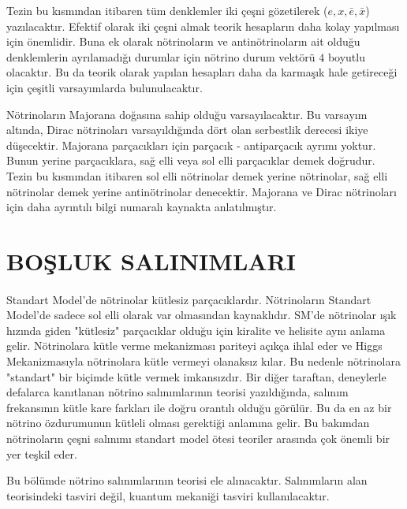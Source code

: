 Tezin bu kısmından itibaren tüm denklemler iki çeşni gözetilerek ($ e,x,\bar{e},\bar{x} $) yazılacaktır. Efektif olarak iki çeşni almak teorik hesapların daha kolay yapılması için önemlidir. Buna ek olarak nötrinoların ve antinötrinoların ait olduğu denklemlerin ayrılamadığı durumlar için nötrino durum vektörü $ 4 $ boyutlu olacaktır. Bu da teorik olarak yapılan hesapları daha da karmaşık hale getireceği için çeşitli varsayımlarda bulunulacaktır.

Nötrinoların Majorana doğasına sahip olduğu varsayılacaktır. Bu varsayım altında, Dirac nötrinoları varsayıldığında dört olan serbestlik derecesi ikiye düşecektir. Majorana parçacıkları için parçacık - antiparçacık ayrımı yoktur. Bunun yerine parçacıklara, sağ elli veya sol elli parçacıklar demek doğrudur. Tezin bu kısmından itibaren sol elli nötrinolar demek yerine nötrinolar, sağ elli nötrinolar demek yerine antinötrinolar denecektir. Majorana ve Dirac nötrinoları için daha ayrıntılı bilgi \cite{Bilenky:2020vjk} numaralı kaynakta anlatılmıştır.

\section{BOŞLUK SALINIMLARI}\label{sec:boslukSalinimlari}
\paragraph{}
Standart Model'de nötrinolar kütlesiz parçacıklardır. Nötrinoların Standart Model'de sadece sol elli olarak var olmasından kaynaklıdır. SM'de nötrinolar ışık hızında giden "kütlesiz" parçacıklar olduğu için kiralite ve helisite aynı anlama gelir. Nötrinolara kütle verme mekanizması pariteyi açıkça ihlal eder ve Higgs Mekanizmasıyla nötrinolara kütle vermeyi olanaksız kılar. Bu nedenle nötrinolara "standart" bir biçimde kütle vermek imkansızdır. Bir diğer taraftan, deneylerle defalarca kanıtlanan nötrino salınımlarının teorisi yazıldığında, salınım frekansının kütle kare farkları ile doğru orantılı olduğu görülür. Bu da en az bir nötrino özdurumunun kütleli olması gerektiği anlamına gelir. Bu bakımdan nötrinoların çeşni salınımı standart model ötesi teoriler arasında çok önemli bir yer teşkil eder. 

Bu bölümde nötrino salınımlarının teorisi ele alınacaktır. Salınımların alan teorisindeki tasviri \cite{2010arXiv1011.4300D} değil, kuantum mekaniği tasviri \cite{raffelt1996stars} kullanılacaktır.

